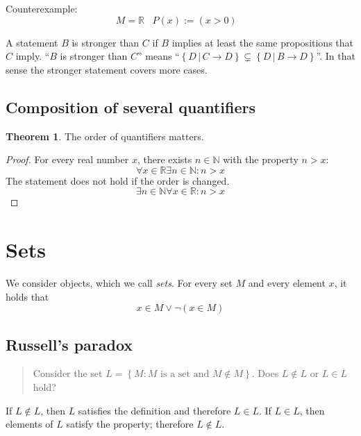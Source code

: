 \documentclass[a4paper,landscape,twocolumn]{article}
\theoremstyle{definition}
\newtheorem{theorem}{Theorem}
\newcommand\set[1]{\left\{#1\right\}}
\newcommand\setdef[2]{\left\{#1\,|\,#2\right\}}
\begin{document}

Counterexample:
\[ M = \mathbb{R} \hspace{10pt} P(x) := ( x > 0 ) \hspace{10pt} \]

A statement $B$ is stronger than $C$ if $B$ implies at least the same propositions that $C$ imply.
\enquote{$B$ is stronger than $C$} means \enquote{$\setdef{D}{C \to D} \subsetneq \setdef{D}{B \to D}$}.
In that sense the stronger statement covers more cases.

\subsection{Composition of several quantifiers}
%
\begin{theorem}
  The order of quantifiers matters.
\end{theorem}
\begin{proof}
  For every real number $x$, there exists $n \in \mathbb{N}$ with the property $n > x$:
  \[ \forall x \in \mathbb{R} \exists n \in \mathbb{N}: n > x \]
  The statement does not hold if the order is changed.
  \[ \exists n \in \mathbb{N} \forall x \in \mathbb{R}: n > x \]
\end{proof}

\section{Sets}
%
We consider objects, which we call \emph{sets}.
For every set $M$ and every element $x$, it holds that
\[ x \in M \lor \neg(x \in M) \]

\subsection{Russell's paradox}

\begin{quote}
  Consider the set $L = \set{M: M \text{ is a set and } M \not\in M}$.
  Does $L \not\in L$ or $L \in L$ hold?
\end{quote}

If $L \not\in L$, then $L$ satisfies the definition and therefore $L \in L$.
If $L \in L$, then elements of $L$ satisfy the property; therefore $L \not\in L$.
\end{document}
